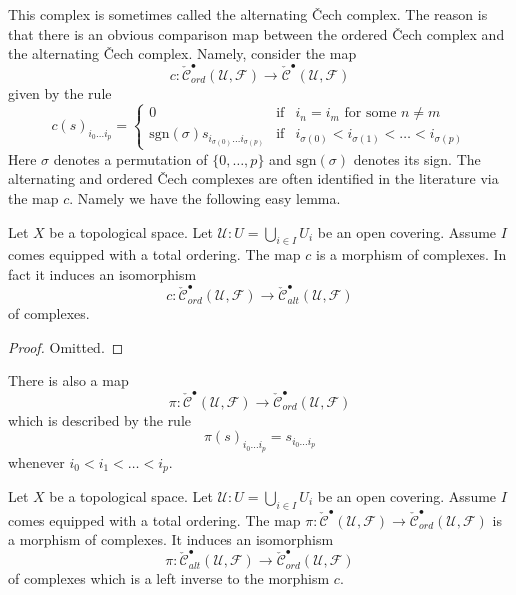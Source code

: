 \noindent
This complex is sometimes called the alternating {\v C}ech complex.
The reason is that there is an obvious comparison map between
the ordered {\v C}ech complex and the alternating {\v C}ech complex.
Namely, consider the map
$$
c :
\check{\mathcal{C}}_{ord}^\bullet(\mathcal{U}, \mathcal{F})
\longrightarrow
\check{\mathcal{C}}^\bullet(\mathcal{U}, \mathcal{F})
$$
given by the rule
$$
c(s)_{i_0\ldots i_p} =
\left\{
\begin{matrix}
0 &
\text{if} &
i_n = i_m \text{ for some } n \not = m\\
\text{sgn}(\sigma) s_{i_{\sigma(0)}\ldots i_{\sigma(p)}} &
\text{if} &
i_{\sigma(0)} < i_{\sigma(1)} < \ldots < i_{\sigma(p)}
\end{matrix}
\right.
$$
Here $\sigma$ denotes a permutation of $\{0, \ldots, p\}$ and
$\text{sgn}(\sigma)$ denotes its sign. The alternating and ordered
{\v C}ech complexes are often identified in the literature via the map
$c$. Namely we have the following easy lemma.

\begin{lemma}
\label{lemma-ordered-alternating}
Let $X$ be a topological space.
Let $\mathcal{U} : U = \bigcup_{i \in I} U_i$ be an open covering.
Assume $I$ comes equipped with a total ordering.
The map $c$ is a morphism of complexes. In fact it induces
an isomorphism
$$
c : \check{\mathcal{C}}_{ord}^\bullet(\mathcal{U}, \mathcal{F})
\to \check{\mathcal{C}}_{alt}^\bullet(\mathcal{U}, \mathcal{F})
$$
of complexes.
\end{lemma}

\begin{proof}
Omitted.
\end{proof}

\noindent
There is also a map
$$
\pi :
\check{\mathcal{C}}^\bullet(\mathcal{U}, \mathcal{F})
\longrightarrow
\check{\mathcal{C}}_{ord}^\bullet(\mathcal{U}, \mathcal{F})
$$
which is described by the rule
$$
\pi(s)_{i_0\ldots i_p} = s_{i_0\ldots i_p}
$$
whenever $i_0 < i_1 < \ldots < i_p$.

\begin{lemma}
\label{lemma-project-to-ordered}
Let $X$ be a topological space.
Let $\mathcal{U} : U = \bigcup_{i \in I} U_i$ be an open covering.
Assume $I$ comes equipped with a total ordering.
The map $\pi : \check{\mathcal{C}}^\bullet(\mathcal{U}, \mathcal{F})
\to \check{\mathcal{C}}_{ord}^\bullet(\mathcal{U}, \mathcal{F})$
is a morphism of complexes. It induces an isomorphism
$$
\pi : \check{\mathcal{C}}_{alt}^\bullet(\mathcal{U}, \mathcal{F})
\to \check{\mathcal{C}}_{ord}^\bullet(\mathcal{U}, \mathcal{F})
$$
of complexes which is a left inverse to the morphism $c$.
\end{lemma}

